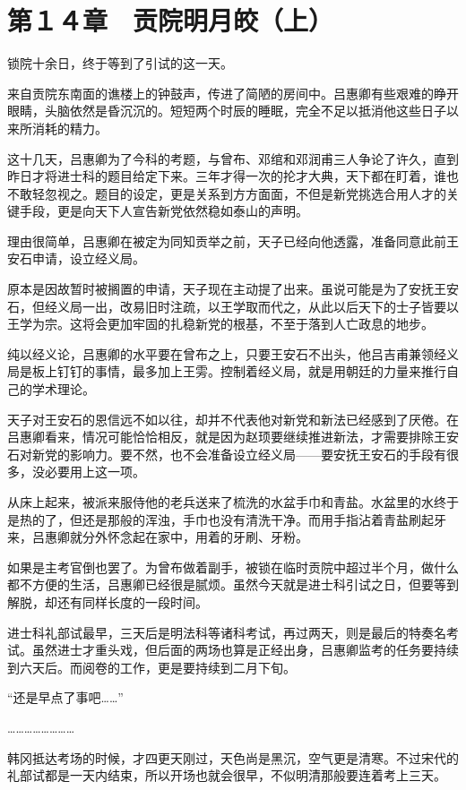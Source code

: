 \section{第１４章　贡院明月皎（上）}

锁院十余日，终于等到了引试的这一天。

来自贡院东南面的谯楼上的钟鼓声，传进了简陋的房间中。吕惠卿有些艰难的睁开眼睛，头脑依然是昏沉沉的。短短两个时辰的睡眠，完全不足以抵消他这些日子以来所消耗的精力。

这十几天，吕惠卿为了今科的考题，与曾布、邓绾和邓润甫三人争论了许久，直到昨日才将进士科的题目给定下来。三年才得一次的抡才大典，天下都在盯着，谁也不敢轻忽视之。题目的设定，更是关系到方方面面，不但是新党挑选合用人才的关键手段，更是向天下人宣告新党依然稳如泰山的声明。

理由很简单，吕惠卿在被定为同知贡举之前，天子已经向他透露，准备同意此前王安石申请，设立经义局。

原本是因故暂时被搁置的申请，天子现在主动提了出来。虽说可能是为了安抚王安石，但经义局一出，改易旧时注疏，以王学取而代之，从此以后天下的士子皆要以王学为宗。这将会更加牢固的扎稳新党的根基，不至于落到人亡政息的地步。

纯以经义论，吕惠卿的水平要在曾布之上，只要王安石不出头，他吕吉甫兼领经义局是板上钉钉的事情，最多加上王雱。控制着经义局，就是用朝廷的力量来推行自己的学术理论。

天子对王安石的恩信远不如以往，却并不代表他对新党和新法已经感到了厌倦。在吕惠卿看来，情况可能恰恰相反，就是因为赵顼要继续推进新法，才需要排除王安石对新党的影响力。要不然，也不会准备设立经义局——要安抚王安石的手段有很多，没必要用上这一项。

从床上起来，被派来服侍他的老兵送来了梳洗的水盆手巾和青盐。水盆里的水终于是热的了，但还是那般的浑浊，手巾也没有清洗干净。而用手指沾着青盐刷起牙来，吕惠卿就分外怀念起在家中，用着的牙刷、牙粉。

如果是主考官倒也罢了。为曾布做着副手，被锁在临时贡院中超过半个月，做什么都不方便的生活，吕惠卿已经很是腻烦。虽然今天就是进士科引试之日，但要等到解脱，却还有同样长度的一段时间。

进士科礼部试最早，三天后是明法科等诸科考试，再过两天，则是最后的特奏名考试。虽然进士才重头戏，但后面的两场也算是正经出身，吕惠卿监考的任务要持续到六天后。而阅卷的工作，更是要持续到二月下旬。

“还是早点了事吧……”

……………………

韩冈抵达考场的时候，才四更天刚过，天色尚是黑沉，空气更是清寒。不过宋代的礼部试都是一天内结束，所以开场也就会很早，不似明清那般要连着考上三天。

